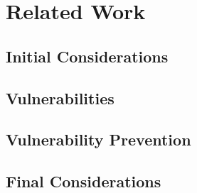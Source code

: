 \chapter{Related Work}
\label{ch:referencial}

\section{Initial Considerations}

\section {Vulnerabilities}


\section {Vulnerability Prevention}


\section{Final Considerations}


